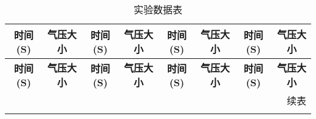 \documentclass[dvipsnames, svgnames,a4paper,11pt]{article}
\begin{document}
	\begin{longtable}{|c|c|c|c|c|c|c|c|}
		\caption{实验数据表} \\
		
		\hline
		\textbf{时间(S)} & \textbf{气压大小} & \textbf{时间(S)} & \textbf{气压大小} & \textbf{时间(S)} & \textbf{气压大小} & \textbf{时间(S)} & \textbf{气压大小} \\
		\hline
		\endfirsthead
		
		\hline
		\textbf{时间(S)} & \textbf{气压大小} & \textbf{时间(S)} & \textbf{气压大小} & \textbf{时间(S)} & \textbf{气压大小} & \textbf{时间(S)} & \textbf{气压大小} \\
		\hline
		\endhead
		
		\hline
		\multicolumn{8}{r}{续表} \\
		\endfoot
		
		\hline
		\endlastfoot
		

\end{longtable}
\end{document}

